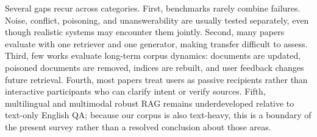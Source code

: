 Several gaps recur across categories. First, benchmarks rarely combine failures. Noise, conflict, poisoning, and unanswerability are usually tested separately, even though realistic systems may encounter them jointly. Second, many papers evaluate with one retriever and one generator, making transfer difficult to assess. Third, few works evaluate long-term corpus dynamics: documents are updated, poisoned documents are removed, indices are rebuilt, and user feedback changes future retrieval. Fourth, most papers treat users as passive recipients rather than interactive participants who can clarify intent or verify sources. Fifth, multilingual and multimodal robust RAG remains underdeveloped relative to text-only English QA; because our corpus is also text-heavy, this is a boundary of the present survey rather than a resolved conclusion about those areas.
